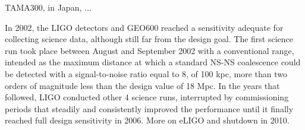 
TAMA300, in Japan, ...

In 2002, the LIGO detectors and GEO600 reached a sensitivity adequate for collecting science data, although still far from the design goal. 
The first science run took place between August and September 2002 with a conventional range, intended as the maximum distance at which a standard NS-NS coalescence could be detected with a signal-to-noise ratio equal to 8, of 100 kpc, more than two orders of magnitude less than the design value of 18 Mpc. In the years that followed, LIGO conducted other 4 science runs, interrupted by commissioning periods that steadily and consistently improved the performance until it finally reached full design sensitivity in 2006. More on eLIGO and shutdown in 2010.






